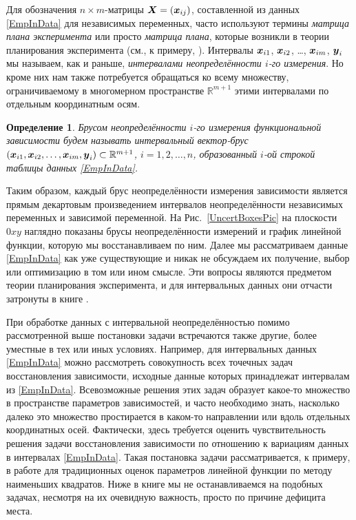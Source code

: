 \documentclass[a5paper,openany]{book}
\newcommand{\mbf}[1]{\protect\text{\boldmath$#1$}}
\newcommand{\mbb}{\mathbb}
\newtheorem{definition}{Определение}[section]
\begin{document}
  
Для обозначения $n\times m$-матрицы $\mbf{X} = (\mbf{x}_{ij})$, составленной из данных 
\eqref{EmpInData} для независимых переменных, часто используют термины \textit{матрица 
плана эксперимента} или просто \textit{матрица плана}, которые возникли в теории 
планирования эксперимента (см., к примеру, \cite{ErmakovZhiglyavski}). Интервалы 
$\mbf{x}_{i1}$, $\mbf{x}_{i2}$, \ldots, $\mbf{x}_{im}$, $\mbf{y}_{i}$ мы называем, 
как и раньше, \textit{интервалами неопределённости $i$-го измерения}. Но кроме них 
нам также потребуется обращаться ко всему множеству, ограничиваемому в многомерном 
пространстве $\mbb{R}^{m+1}$ этими интервалами по отдельным координатным осям. 
   
\begin{definition} 
\textsl{Брусом неопределённости} $i$-го измерения функциональной зависимости будем 
называть интервальный вектор-брус $(\mbf{x}_{i1}, \mbf{x}_{i2}, \ldots, \mbf{x}_{im}, 
\mbf{y}_{i}) \subset \mbb{R}^{m+1}$, $i = 1,2,\ldots,n$, образованный $i$-ой строкой 
таблицы данных \eqref{EmpInData}.           
\end{definition} 
  
Таким образом, каждый брус неопределённости измерения зависимости является прямым 
декартовым произведением интервалов неопределённости независимых переменных и зависимой 
переменной. На Рис.~\ref{UncertBoxesPic} на плоскости $0xy$ наглядно показаны брусы 
неопределённости измерений и график линейной функции, которую мы восстанавливаем 
по ним. Далее мы рассматриваем данные \eqref{EmpInData} как уже существующие и никак 
не обсуждаем их получение, выбор или оптимизацию в том или ином смысле. Эти вопросы 
являются предметом теории планирования эксперимента, и для интервальных данных 
они отчасти затронуты в книге \cite{Dyvak}.  
    
При обработке данных с интервальной неопределённостью помимо рассмотренной выше 
постановки задачи встречаются также другие, более уместные в тех или иных условиях. 
Например, для интервальных данных \eqref{EmpInData} можно рассмотреть совокупность 
всех точечных задач восстановления зависимости, исходные данные которых принадлежат 
интервалам из \eqref{EmpInData}. Всевозможные решения этих задач образует какое-то 
множество в пространстве параметров зависимостей, и часто необходимо знать, насколько 
далеко это множество простирается в каком-то направлении или вдоль отдельных координатных 
осей. Фактически, здесь требуется оценить чувствительность решения задачи восстановления 
зависимости по отношению к вариациям данных в интервалах \eqref{EmpInData}. Такая 
постановка задачи рассматривается, к примеру, в работе \cite{SharyMoradi} для традиционных 
оценок параметров линейной функции по методу наименьших квадратов. Ниже в книге мы 
не останавливаемся на подобных задачах, несмотря на их очевидную важность, просто 
по причине дефицита места. 
  
\end{document}
